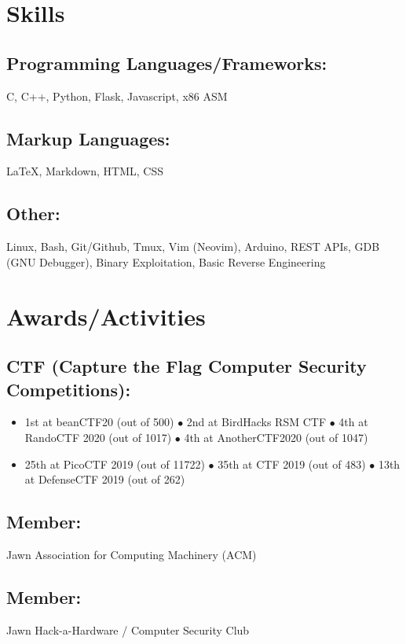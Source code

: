 \documentclass{article}
\begin{document}
\section{Skills}
\subsection{Programming Languages/Frameworks:}
C, C++, Python, Flask, Javascript, x86 ASM
\subsection{Markup Languages:}
{\LaTeX}, Markdown, HTML, CSS
\subsection{Other:}
Linux, Bash, Git/Github, Tmux, Vim (Neovim), Arduino, REST APIs, GDB (GNU Debugger), Binary Exploitation, Basic Reverse Engineering

\section{Awards/Activities}
\subsection{CTF (Capture the Flag Computer Security Competitions):}
\begin{itemize}
    \item 1st at beanCTF20 (out of 500) $\bullet$ 2nd at BirdHacks RSM CTF $\bullet$ 4th at RandoCTF 2020 (out of 1017) $\bullet$ 4th at AnotherCTF2020 (out of 1047)
    \item 25th at PicoCTF 2019 (out of 11722) $\bullet$ 35th at CTF 2019 (out of 483) $\bullet$ 13th at DefenseCTF 2019 (out of 262)
\end{itemize} 
\subsection{Member: } Jawn Association for Computing Machinery (ACM)
\subsection{Member: } Jawn Hack-a-Hardware / Computer Security Club 
\end{document}
